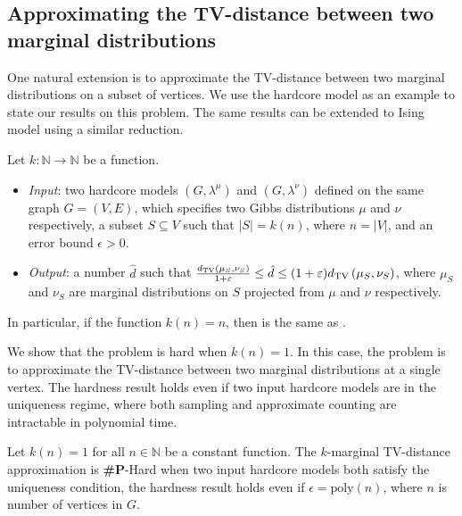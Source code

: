 \subsection{Approximating the TV-distance between two marginal distributions}
One natural extension is to approximate the TV-distance between two marginal distributions on a subset of vertices.
We use the hardcore model as an example to state our results on this problem. The same results can be extended to Ising model using a similar reduction.

\begin{problem}\label{label:prob-mar} 
Let $k:\mathbb{N} \to \mathbb{N}$ be a function. 
\begin{itemize}
    \item \emph{Input}: two hardcore models $(G,\lambda^\mu)$ and $(G,\lambda^\nu)$ defined on the same graph $G = (V,E)$, which specifies two Gibbs distributions $\mu$ and $\nu$ respectively, a subset $S \subseteq V$ such that $|S| = k(n)$, where $n = |V|$, and an error bound $\epsilon > 0$.
    \item \emph{Output}: a number $\hat{d}$ such that $ \frac{d_{\mathrm{TV}}\left({\mu_S},{\nu_S}\right)}{1+\varepsilon} \leq \hat{d} \leq (1 + \varepsilon)d_{\mathrm{TV}}\left({\mu_S},{\nu_S}\right)$, where $\mu_S$ and $\nu_S$ are marginal distributions on $S$ projected from $\mu$ and $\nu$ respectively.
\end{itemize}
\end{problem}
In particular, if the function $k(n) = n$, then  is the same as .

We show that the problem is hard when $k(n) = 1$. In this case, the problem is to approximate the TV-distance between two marginal distributions at a single vertex. The hardness result holds even if two input hardcore models are in the uniqueness regime, where both sampling and approximate counting are intractable in polynomial time.
\begin{theorem}\label{thm:one-vertex}
Let $k(n) = 1$ for all $n \in \mathbb{N}$ be a constant function.  The $k$-marginal TV-distance approximation is \textbf{\#P}-Hard when two input hardcore models both satisfy the uniqueness condition, the hardness result holds even if $\epsilon = \mathrm{poly}(n)$, where  $n$ is number of vertices in $G$.
\end{theorem}

